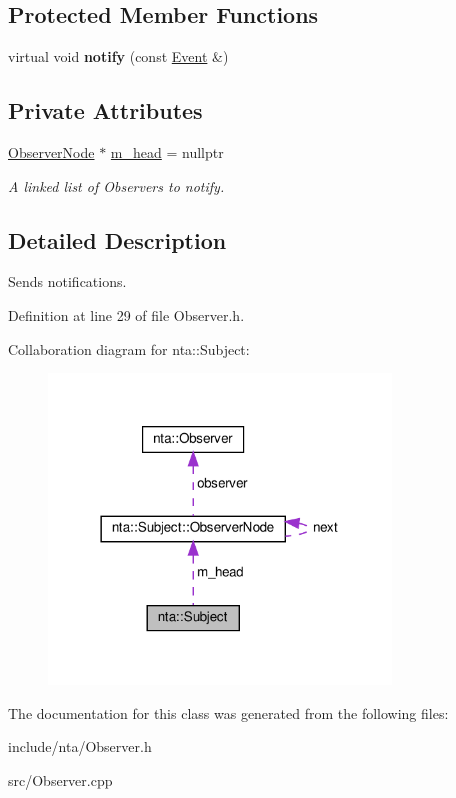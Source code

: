 \subsection*{Protected Member Functions}
\begin{DoxyCompactItemize}
\item 
\mbox{\label{classnta_1_1Subject_aefbbc64af07ff9f4a35870cf5b51ce03}} 
virtual void {\bfseries notify} (const \hyperlink{structnta_1_1Event}{Event} \&)
\end{DoxyCompactItemize}
\subsection*{Private Attributes}
\begin{DoxyCompactItemize}
\item 
\mbox{\label{classnta_1_1Subject_a7049999f4dcfbaa6ce6af23a98ff2027}} 
\hyperlink{structnta_1_1Subject_1_1ObserverNode}{Observer\+Node} $\ast$ \hyperlink{classnta_1_1Subject_a7049999f4dcfbaa6ce6af23a98ff2027}{m\+\_\+head} = nullptr
\begin{DoxyCompactList}\small\item\em A linked list of Observers to notify. \end{DoxyCompactList}\end{DoxyCompactItemize}


\subsection{Detailed Description}
Sends notifications. 

Definition at line 29 of file Observer.\+h.



Collaboration diagram for nta\+:\+:Subject\+:\nopagebreak
\begin{figure}[H]
\begin{center}
\leavevmode
\includegraphics[width=258pt]{d5/d37/classnta_1_1Subject__coll__graph}
\end{center}
\end{figure}


The documentation for this class was generated from the following files\+:\begin{DoxyCompactItemize}
\item 
include/nta/Observer.\+h\item 
src/Observer.\+cpp\end{DoxyCompactItemize}
